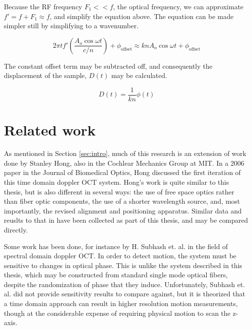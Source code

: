 Because the RF frequency $F_1 << f$, the optical frequency, we can approximate $f' = f + F_1 \approx f$, and simplify the equation above. The equation can be made simpler still by simplifying to a wavenumber.

\begin{equation}
2 \pi t f'  \left( \frac{A_o \cos{\omega t}}{c/n} \right) + \phi_{\mathrm{offset}} \approx k n A_o \cos{\omega t} + \phi_{\mathrm{offset}}
\end{equation}

The constant offset term may be subtracted off, and consequently the displacement of the sample, $D(t)$ may be calculated.


\begin{equation}
D(t) = \frac{1}{kn} \phi(t)
\end{equation}

\section{Related work}

As mentioned in Section \ref{sec:intro}, much of this research is an extension of work done by Stanley Hong, also in the Cochlear Mechanics Group at MIT. In a 2006 paper in the Journal of Biomedical Optics, Hong discussed the first iteration of this time domain doppler OCT system. \cite{hong} Hong's work is quite similar to this thesis, but is also different in several ways: the use of free space optics rather than fiber optic components, the use of a shorter wavelength source, and, most importantly, the revised alignment and positioning apparatus. Similar data and reuslts to that in \cite{hong} have been collected as part of this thesis, and may be compared directly.


Some work has been done, for instance by H. Subhash et. al. in the field of spectral domain doppler OCT. \cite{Subhash2012} In order to detect motion, the system must be sensitive to changes in optical phase. This is unlike the system described in this thesis, which may be constructed from standard single mode optical fibers, despite the randomization of phase that they induce. Unfortunately, Subhash et. al. did not provide sensitivity results to compare against, but it is theorized that a time domain approach can result in higher resolution motion measurements, though at the considerable expense of requiring physical motion to scan the z-axis.

